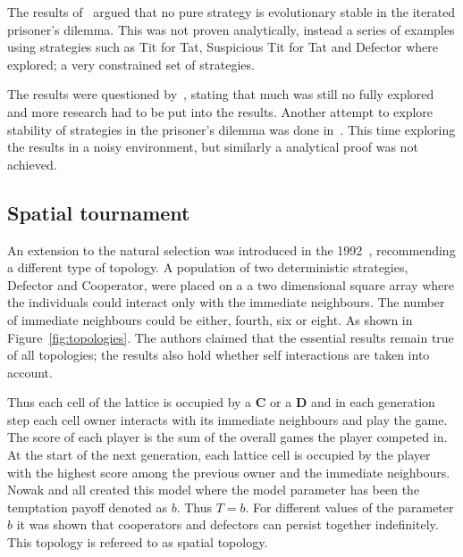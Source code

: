 \documentclass{article}
\begin{document}
The results of~\cite{Boyd1987} argued that no pure strategy is evolutionary
stable in the iterated prisoner's dilemma. This was not proven analytically, instead
a series of examples using strategies such as Tit for Tat, Suspicious
Tit for Tat and Defector where explored; a very constrained set of strategies.

The results were questioned by~\cite{May1987}, stating that much was
still no fully explored and more research had to be put into the results.
Another attempt to explore stability of strategies in the prisoner's dilemma
was done in~\cite{Boyd1989}. This time exploring the results in a noisy
environment, but similarly a analytical proof was not achieved.

\subsection{Spatial tournament}

An extension to the natural selection was introduced in the 1992~\cite{Nowak1992b},
recommending a different type of topology. A population of two deterministic
strategies, Defector and Cooperator, were placed on a a two dimensional square array
where the individuals could interact only with the immediate neighbours.
The number of immediate neighbours could be either, fourth, six or eight. As
shown in Figure~\ref{fig:topologies}. The authors claimed that the essential
results remain true of all topologies; the results also hold whether self interactions
are taken into account.

Thus each cell of the lattice is occupied by a \textbf{C} or a \textbf{D} and in
each generation step each cell owner interacts with its immediate neighbours and
play the game. The score of each player is the sum of the overall games the player
competed in. At the start of the next generation, each lattice cell is occupied by the
player with the highest score among the previous owner and the immediate
neighbours. Nowak and all created this model where the model parameter
has been the temptation payoff denoted as \(b\). Thus \(T=b\). For 
different values of the parameter \(b\) it was shown that cooperators and
defectors can persist together indefinitely. This topology is refereed to as
spatial topology.
\end{document}
